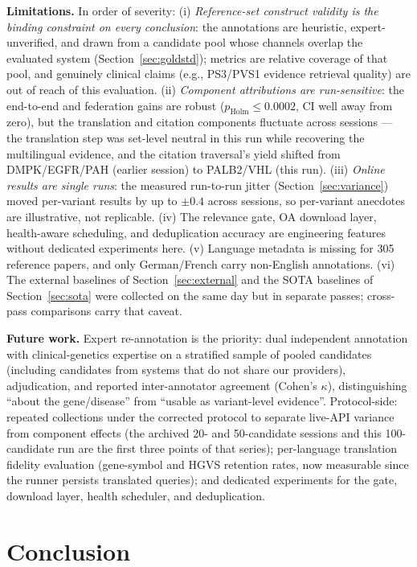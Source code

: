\documentclass[nonacm,sigconf]{acmart}
\begin{document}
\textbf{Limitations.} In order of severity: (i) \emph{Reference-set
construct validity is the binding constraint on every conclusion}: the
annotations are heuristic, expert-unverified, and drawn from a candidate
pool whose channels overlap the evaluated system
(Section~\ref{sec:goldstd}); metrics are relative coverage of that pool,
and genuinely clinical claims (e.g., PS3/PVS1 evidence retrieval quality)
are out of reach of this evaluation. (ii) \emph{Component attributions
are run-sensitive}: the end-to-end and federation gains are robust
($p_{\text{Holm}} \le 0.0002$, CI well away from zero), but the
translation and citation components fluctuate across sessions --- the
translation step was set-level neutral in this run while recovering the
multilingual evidence, and the citation traversal's yield shifted from
DMPK/EGFR/PAH (earlier session) to PALB2/VHL (this run). (iii)
\emph{Online results are single runs}: the measured run-to-run jitter
(Section~\ref{sec:variance}) moved per-variant results by up to
$\pm0.4$ across sessions, so per-variant anecdotes are illustrative, not
replicable. (iv) The relevance gate, OA download layer, health-aware
scheduling, and deduplication accuracy are engineering features without
dedicated experiments here. (v) Language metadata is missing for 305
reference papers, and only German/French carry non-English annotations.
(vi) The external baselines of Section~\ref{sec:external} and the SOTA
baselines of Section~\ref{sec:sota} were collected on the same day but
in separate passes; cross-pass comparisons carry that caveat.

\textbf{Future work.} Expert re-annotation is the priority: dual
independent annotation with clinical-genetics expertise on a stratified
sample of pooled candidates (including candidates from systems that do
not share our providers), adjudication, and reported inter-annotator
agreement (Cohen's $\kappa$), distinguishing ``about the gene/disease''
from ``usable as variant-level evidence''. Protocol-side: repeated
collections under the corrected protocol to separate live-API variance
from component effects (the archived 20- and 50-candidate sessions and
this 100-candidate run are the first three points of that series);
per-language translation fidelity evaluation (gene-symbol and HGVS
retention rates, now measurable since the runner persists translated
queries); and dedicated experiments for the gate, download layer, health
scheduler, and deduplication.

\section{Conclusion}
\label{sec:conclusion}
\end{document}
